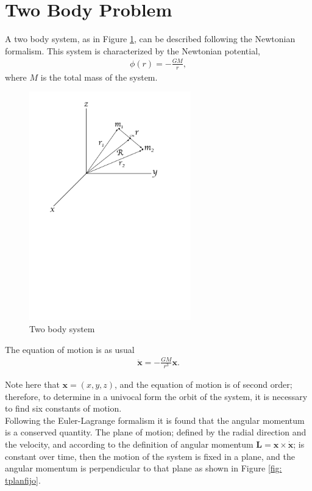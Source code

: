 \section{Two Body Problem}

A two body system, as in Figure \ref{fig: twobodysystem}, can be described following the Newtonian formalism. This system is characterized by the Newtonian potential,
\begin{align}
	\phi (r) = -\frac{GM}{r},
\end{align}
where $M$ is the total mass of the system.
\begin{figure}[htb!]
\centering
\includegraphics[width=7cm]{../Tesis/Capitulo0/Figures/Coordenadas.pdf}
\caption{Two body system}
\label{fig: twobodysystem}
\end{figure}

The equation of motion is as usual
\begin{align}
	\ddot{\mathbf{x}} = -\frac{GM}{r^3} \mathbf{x}.
	\label{eq: newtonianeqmotion}
\end{align}

Note here that $\mathbf{x} = (x,y,z)$, and the equation of motion is of second order; therefore, to determine in a univocal form the orbit of the system, it is necessary to find six constants of motion.\\

Following the Euler-Lagrange formalism it is found that the angular momentum is a conserved quantity. The plane of motion; defined by the radial direction and the velocity, and according to the definition of angular momentum $\mathbf{L} = \mathbf{x} \times \dot{\mathbf{x}}$; is constant over time, then the motion of the system is fixed in a plane, and the angular momentum is perpendicular to that plane as shown in Figure \ref{fig: tplanfijo}.\\

